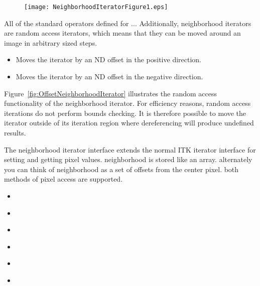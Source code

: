 \begin{figure}
\centering
\texttt{[image: NeighborhoodIteratorFigure1.eps]}
\protect\label{fig:WalkingNeighborhoodIterator}
\end{figure}

All of the standard operators defined for ... Additionally, neighborhood
iterators are random access iterators, which means that they can be moved
around an image in arbitrary sized steps.

\begin{itemize}
\item \textbf{} Moves the iterator by an ND
offset in the positive direction.

\item \textbf{} Moves the iterator by an ND
offset in the negative direction.
\end{itemize}

Figure~\ref{fig:OffsetNeighborhoodIterator} illustrates the random access
functionality of the neighborhood iterator.  For efficiency reasons, random
access iterations do not perform bounds checking.  It is therefore possible to
move the iterator outside of its iteration region where dereferencing will
produce undefined results.




The neighborhood iterator interface extends the normal ITK iterator interface
for setting and getting pixel values.  neighborhood is stored like an array.
alternately you can think of neighborhood as a set of offsets from the center
pixel.  both methods of pixel access are supported.

\begin{itemize}
\item \textbf{} 
\item \textbf{} 

\item \textbf{} 
\item \textbf{} 

\item \textbf{} 
\item \textbf{} 

\end{itemize}

